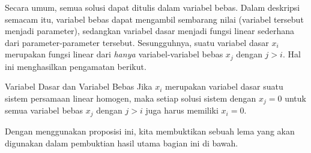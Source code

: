 Secara umum, semua solusi dapat ditulis dalam variabel bebas. Dalam deskripsi semacam itu, variabel bebas dapat mengambil sembarang nilai (variabel tersebut menjadi parameter), sedangkan variabel dasar menjadi fungsi linear sederhana dari parameter-parameter tersebut. Sesungguhnya, suatu variabel dasar $x_i$ merupakan fungsi linear dari {\em hanya \em}variabel-variabel bebas $x_j$ dengan $j>i$. Hal ini menghasilkan pengamatan berikut.

\begin{proposition}{Variabel Dasar dan Variabel Bebas}\label{prop:basicfree}
Jika $x_i$ merupakan variabel dasar suatu sistem persamaan linear homogen, maka setiap solusi sistem dengan $x_j=0$ untuk semua variabel bebas $x_j$ dengan $j>i$ juga harus memiliki $x_i=0$.
\end{proposition}

Dengan menggunakan proposisi ini, kita membuktikan sebuah lema yang akan digunakan dalam pembuktian hasil utama bagian ini di bawah.

